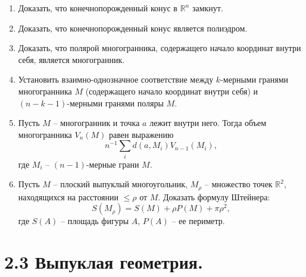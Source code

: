 	\begin{enumerate}[resume*]
		\item Доказать, что конечнопорожденный конус в $\mathbb{R}^n$ замкнут.

		\item Доказать, что конечнопорожденный конус является полиэдром.

		\item Доказать, что полярой многогранника, содержащего начало координат внутри себя, является многогранник.

		\item Установить взаимно-однозначное соответствие между $k$-мерными гранями многогранника $M$ (содержащего начало координат внутри себя) и $(n-k-1)$-мерными гранями поляры $M$.

		\item Пусть $M$ -- многогранник и точка $a$ лежит внутри него. Тогда объем многогранника $V_n(M)$ равен выражению 
		\[
			n^{-1} \sum_i d(a, M_i) V_{n-1}(M_i),
		\]
		где $M_i$ -- $(n-1)$-мерные грани $M$.

		\item Пусть $M$ -- плоский выпуклый многоугольник, $M_\rho$ -- множество точек $\mathbb{R}^2$, находящихся на расстоянии $\le \rho$ от $M$. Доказать формулу Штейнера:
		\[
			S(M_\rho) = S(M) + \rho P(M) + \pi \rho^2,
		\]
		где $S(A)$ -- площадь фигуры $A$, $P(A)$ -- ее периметр.

	\end{enumerate}

	\section{2.3 Выпуклая геометрия.}

